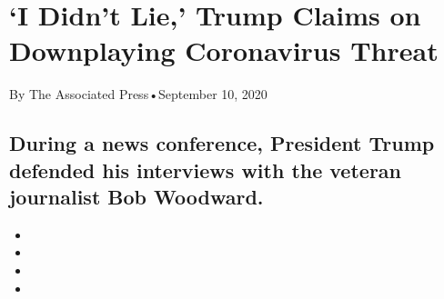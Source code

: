 \hypertarget{i-didnt-lie-trump-claims-on-downplaying-coronavirus-threat-1}{%
\section{`I Didn't Lie,' Trump Claims on Downplaying Coronavirus
Threat}\label{i-didnt-lie-trump-claims-on-downplaying-coronavirus-threat-1}}

By The Associated Press•September 10, 2020

\hypertarget{during-a-news-conference-president-trump-defended-his-interviews-with-the-veteran-journalist-bob-woodward-1}{%
\subsection{During a news conference, President Trump defended his
interviews with the veteran journalist Bob
Woodward.}\label{during-a-news-conference-president-trump-defended-his-interviews-with-the-veteran-journalist-bob-woodward-1}}

\begin{itemize}
\item
\item
\item
\item
\end{itemize}

